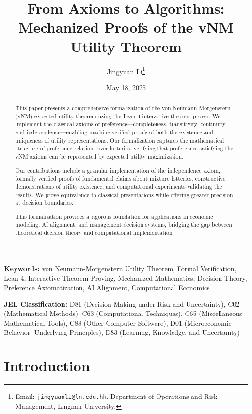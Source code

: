 \documentclass{article}
\title{From Axioms to Algorithms: \\ Mechanized Proofs of the vNM Utility Theorem}
\author{Jingyuan Li\thanks{Email: \texttt{jingyuanli@ln.edu.hk}. Department of Operations and Risk Management, Lingnan University.}}
\date{May 18, 2025}
\theoremstyle{definition}
\begin{document}
\maketitle
\begin{abstract}
This paper presents a comprehensive formalization of the von Neumann-Morgenstern (vNM) expected utility theorem using the Lean 4 interactive theorem prover. We implement the classical axioms of preference—completeness, transitivity, continuity, and independence—enabling machine-verified proofs of both the existence and uniqueness of utility representations. Our formalization captures the mathematical structure of preference relations over lotteries, verifying that preferences satisfying the vNM axioms can be represented by expected utility maximization.

Our contributions include a granular implementation of the independence axiom, formally verified proofs of fundamental claims about mixture lotteries, constructive demonstrations of utility existence, and computational experiments validating the results. We prove equivalence to classical presentations while offering greater precision at decision boundaries.

This formalization provides a rigorous foundation for applications in economic modeling, AI alignment, and management decision systems, bridging the gap between theoretical decision theory and computational implementation.
\end{abstract}


\begin{flushleft}
\textbf{Keywords:} von Neumann-Morgenstern Utility Theorem, Formal Verification, Lean 4, Interactive Theorem Proving, Mechanized Mathematics, Decision Theory, Preference Axiomatization, AI Alignment, Computational Economics
\end{flushleft}
\smallskip
\begin{flushleft}
\textbf{JEL Classification:} D81 (Decision-Making under Risk and Uncertainty), C02 (Mathematical Methods), C63 (Computational Techniques), C65 (Miscellaneous Mathematical Tools), C88 (Other Computer Software), D01 (Microeconomic Behavior: Underlying Principles), D83 (Learning, Knowledge, and Uncertainty)
\end{flushleft}

\newpage

\section{Introduction}\label{sec:Intro}
\end{document}
